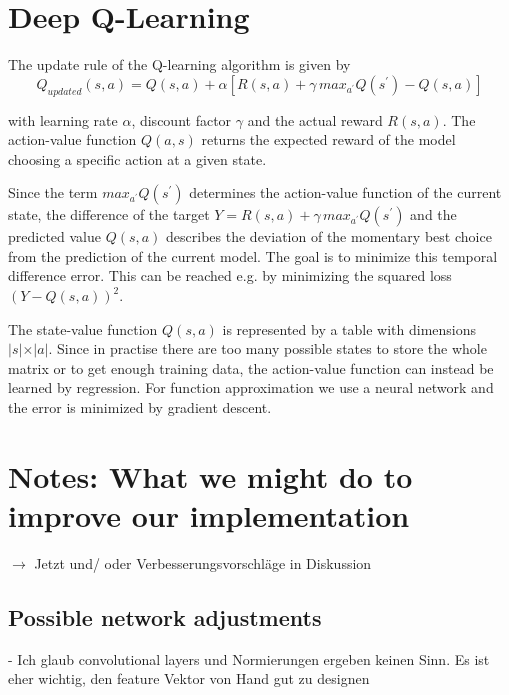 \documentclass[a4paper ,12pt]{report}
\begin{document}
	\section*{Deep Q-Learning}
	The update rule of the Q-learning algorithm is given by
	\begin{equation}
	Q_{updated}(s,a) = Q(s,a) + \alpha\left[R(s,a) + \gamma \, max_{a^{\prime}} Q\left(s^{\prime}\right) - Q(s,a)\right]
	\end{equation}

	with learning rate $\alpha$, discount factor $\gamma$ and the actual reward $R(s,a)$. The action-value function $Q(a,s)$ returns the expected reward of the model choosing a specific action at a given state.
	
	Since the term $max_{a^{\prime}} Q\left(s^{\prime}\right)$ determines the action-value function of the current state, the difference of the target $Y = R(s,a) + \gamma \, max_{a^{\prime}} Q\left(s^{\prime}\right)$ and the predicted value $Q(s,a)$ describes the deviation of the momentary best choice from the prediction of the current model. The goal is to minimize this temporal difference error. This can be reached e.g. by minimizing the squared loss $(Y-Q(s,a))^2$.\cite{UBHD-68505368}
	
	\vspace{0.5cm}
	
	The state-value function $Q(s, a)$ is represented by a table with dimensions $\lvert s \lvert \times \lvert a \lvert $. Since in practise there are too many possible states to store the whole matrix or to get enough training data, the action-value function can instead be learned by regression. For function approximation we use a neural network and the error is minimized by gradient descent. \cite{Lecture}
	
	\newpage
	
	\section*{Notes: What we might do to improve our implementation}
	$\rightarrow$ Jetzt und/ oder Verbesserungsvorschläge in Diskussion
	
	\subsection*{Possible network adjustments}
	
	- Ich glaub convolutional layers und Normierungen ergeben keinen Sinn. Es ist eher wichtig, den feature Vektor von Hand gut zu designen
	
\end{document}
